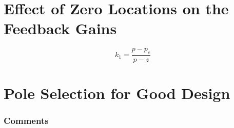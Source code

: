 
\section*{Effect of Zero Locations on the Feedback Gains} %
\label{sec:effect_of_zero_locations_on_the_feedback_gains}



\ifslidesonly
\begin{slide}
   
\end{slide}
\fi


\ifslidesonly
\begin{slide}
   
\end{slide}
\fi

\ifslidesonly
\begin{slide}
\[
	k_1 =  \frac{p-p_c}{p-z}
\]

\end{slide}
\fi

	

\ifslidesonly
\begin{slide}
   
\end{slide}
\fi


 

\section*{Pole Selection for Good Design} %
\label{sec:pole_selection_for_good_design}


\ifslidesonly
\begin{slide}
   
\end{slide}
\fi



\ifslidesonly
\begin{slide}
   
\end{slide}
\fi

\subsubsection*{Comments} %
\label{ssub:comments}

